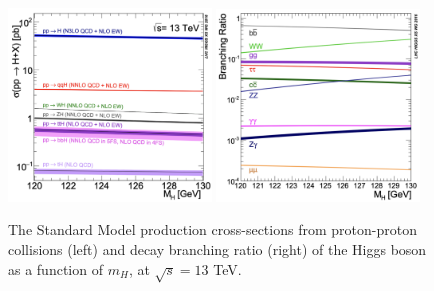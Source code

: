 \begin{figure}[h!]
    \center
    \includegraphics[width=0.48\textwidth]{Images/Theory/prodHiggs.png}
    \includegraphics[width=0.48\textwidth]{Images/Theory/decayHiggs.png}
    \caption{The Standard Model production cross-sections from proton-proton collisions (left) and decay branching ratio (right) of the Higgs boson as a function of $m_H$, at $\sqrt{s} = 13$ TeV.}
    \label{fig:prodH}
\end{figure}







